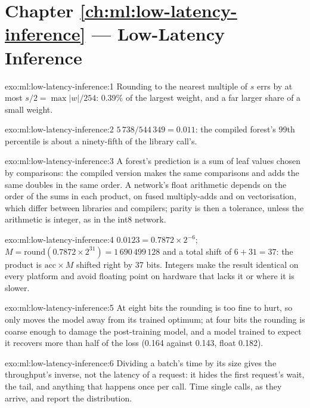 \section*{Chapter \ref{ch:ml:low-latency-inference} --- Low-Latency Inference}

\begin{solution}{exo:ml:low-latency-inference:1}
Rounding to the nearest multiple of $s$ errs by at most $s/2 = \max|w|/254$: 0.39\% of the largest weight, and a far larger
share of a small weight.
\end{solution}

\begin{solution}{exo:ml:low-latency-inference:2}
$5\,738/544\,349 = 0.011$: the compiled forest's 99th percentile is about a ninety-fifth of the library call's.
\end{solution}

\begin{solution}{exo:ml:low-latency-inference:3}
A forest's prediction is a sum of leaf values chosen by comparisons: the compiled version makes the same comparisons and adds the
same doubles in the same order. A network's float arithmetic depends on the order of the sums in each product, on fused
multiply-adds and on vectorisation, which differ between libraries and compilers; parity is then a tolerance, unless the
arithmetic is integer, as in the int8 network.
\end{solution}

\begin{solution}{exo:ml:low-latency-inference:4}
$0.0123 = 0.7872\times2^{-6}$; $M = \mathrm{round}(0.7872\times2^{31}) = 1\,690\,499\,128$ and a total shift of $6 + 31 = 37$: the
product is $\mathrm{acc}\times M$ shifted right by 37 bits. Integers make the result identical on every platform and avoid
floating point on hardware that lacks it or where it is slower.
\end{solution}

\begin{solution}{exo:ml:low-latency-inference:5}
At eight bits the rounding is too fine to hurt, so  only moves the model away from its trained optimum; at four bits
the rounding is coarse enough to damage the post-training model, and a model trained to expect it recovers more than half of the
loss (0.164 against 0.143, float 0.182).
\end{solution}

\begin{solution}{exo:ml:low-latency-inference:6}
Dividing a batch's time by its size gives the throughput's inverse, not the latency of a request: it hides the first request's
wait, the tail, and anything that happens once per call. Time single calls, as they arrive, and report the distribution.
\end{solution}

